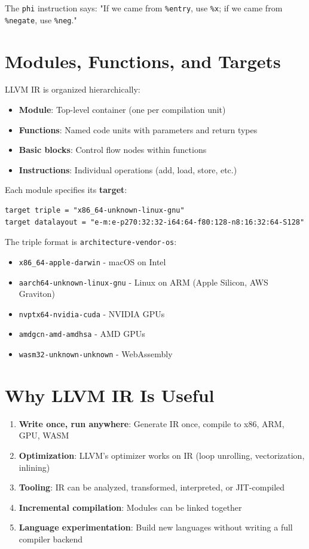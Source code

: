 \documentclass[11pt,oneside]{book}
\begin{document}
The \texttt{phi} instruction says: "If we came from \texttt{\%entry}, use \texttt{\%x}; if we came from \texttt{\%negate}, use \texttt{\%neg}."

\section{Modules, Functions, and Targets}

LLVM IR is organized hierarchically:
\begin{itemize}[noitemsep]
  \item \textbf{Module}: Top-level container (one per compilation unit)
  \item \textbf{Functions}: Named code units with parameters and return types
  \item \textbf{Basic blocks}: Control flow nodes within functions
  \item \textbf{Instructions}: Individual operations (add, load, store, etc.)
\end{itemize}

Each module specifies its \textbf{target}:
\begin{lstlisting}[style=ir]
target triple = "x86_64-unknown-linux-gnu"
target datalayout = "e-m:e-p270:32:32-i64:64-f80:128-n8:16:32:64-S128"
\end{lstlisting}

The triple format is \texttt{architecture-vendor-os}:
\begin{itemize}[noitemsep]
  \item \texttt{x86\_64-apple-darwin} - macOS on Intel
  \item \texttt{aarch64-unknown-linux-gnu} - Linux on ARM (Apple Silicon, AWS Graviton)
  \item \texttt{nvptx64-nvidia-cuda} - NVIDIA GPUs
  \item \texttt{amdgcn-amd-amdhsa} - AMD GPUs
  \item \texttt{wasm32-unknown-unknown} - WebAssembly
\end{itemize}

\section{Why LLVM IR Is Useful}

\begin{enumerate}[noitemsep]
  \item \textbf{Write once, run anywhere}: Generate IR once, compile to x86, ARM, GPU, WASM
  \item \textbf{Optimization}: LLVM's optimizer works on IR (loop unrolling, vectorization, inlining)
  \item \textbf{Tooling}: IR can be analyzed, transformed, interpreted, or JIT-compiled
  \item \textbf{Incremental compilation}: Modules can be linked together
  \item \textbf{Language experimentation}: Build new languages without writing a full compiler backend
\end{enumerate}
\end{document}
